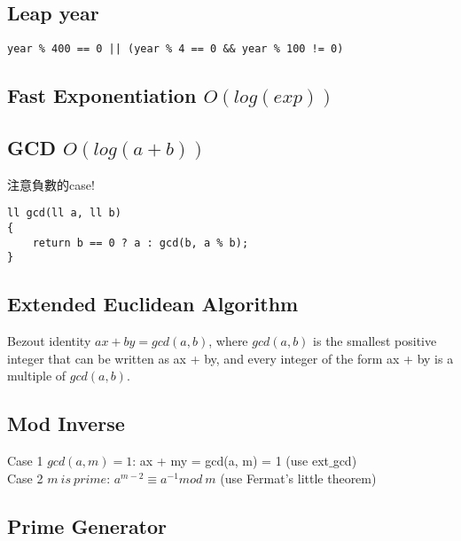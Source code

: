 \documentclass[10pt,oneside]{article}
\begin{document}
\begin{landscape}
\begin{multicols}{2}
\subsection{Leap year}

\begin{lstlisting}
year % 400 == 0 || (year % 4 == 0 && year % 100 != 0)
\end{lstlisting}

\subsection{Fast Exponentiation $O(log(exp))$}



\subsection{GCD $O(log(a + b))$}

注意負數的case!

\begin{lstlisting}
ll gcd(ll a, ll b)
{
    return b == 0 ? a : gcd(b, a % b);
}
\end{lstlisting}

\subsection{Extended Euclidean Algorithm}

Bezout identity $ax + by = gcd(a, b)$, where $gcd(a, b)$ is the smallest positive integer that can be written as ax + by, and every integer of the form ax + by is a multiple of $gcd(a, b)$.



\subsection{Mod Inverse}

Case 1 $gcd(a, m) = 1$:  ax + my = gcd(a, m) = 1 (use ext$\_$gcd) \\

\noindent Case 2 $m\ is\ prime$: $a^{m - 2} \equiv a^{-1} mod\ m$ (use Fermat's little theorem)

\subsection{Prime Generator}



\end{multicols}
\end{landscape}
\end{document}
